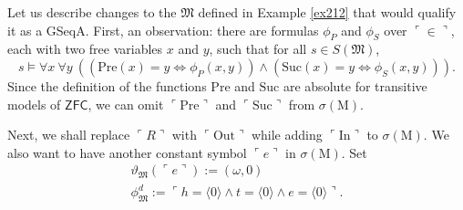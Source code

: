 \documentclass[12pt]{article}
\numberwithin{equation}{section}
\begin{document}
\begin{ex}\label{ex228}
Let us describe changes to the $\mathfrak{M}$ defined in Example \ref{ex212} that would qualify it as a GSeqA. First, an observation: there are formulas $\phi_P$ and $\phi_S$ over $\ulcorner \in \urcorner$, each with two free variables $x$ and $y$, such that for all $s \in S(\mathfrak{M})$,
\begin{equation*}
    s \models \forall x \ \forall y \ ((\mathrm{Pre}(x) = y \iff \phi_P(x, y)) \wedge (\mathrm{Suc}(x) = y \iff \phi_S(x, y))) \text{.}
\end{equation*}
Since the definition of the functions $\mathrm{Pre}$ and $\mathrm{Suc}$ are absolute for transitive models of $\mathsf{ZFC}$, we can omit $\ulcorner \mathrm{Pre} \urcorner$ and $\ulcorner \mathrm{Suc} \urcorner$ from $\sigma(\mathrm{M})$.

Next, we shall replace $\ulcorner R \urcorner$ with $\ulcorner \mathrm{Out} \urcorner$ while adding $\ulcorner \mathrm{In} \urcorner$ to $\sigma(\mathrm{M})$. We also want to have another constant symbol $\ulcorner e \urcorner$ in $\sigma(\mathrm{M})$. Set 
\begin{gather*}
    \vartheta_{\mathfrak{M}}(\ulcorner e \urcorner) := (\omega, 0) \\
    \phi^d_{\mathfrak{M}} := \ulcorner h = \langle 0 \rangle \wedge t = \langle 0 \rangle \wedge e = \langle 0 \rangle \urcorner \text{.}
\end{gather*}


\end{ex}
\end{document}
